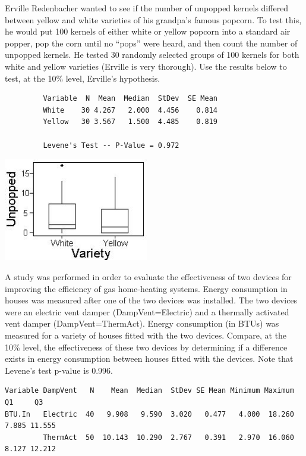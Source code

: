 \documentclass[10pt,openany]{book}\usepackage[]{graphicx}\usepackage[]{color}
\begin{document}
\begin{exsection}
  \item \label{revex:tTestPopcorn} Erville Redenbacher wanted to see if the number of unpopped kernels differed between yellow and white varieties of his grandpa's famous popcorn.  To test this, he would put 100 kernels of either white or yellow popcorn into a standard air popper, pop the corn until no ``pops'' were heard, and then count the number of unpopped kernels.  He tested 30 randomly selected groups of 100 kernels for both white and yellow varieties (Erville is very thorough).  Use the results below to test, at the 10\% level, Erville's hypothesis. 

  \begin{Verbatim}
         Variable  N  Mean  Median  StDev  SE Mean
         White    30 4.267   2.000  4.456    0.814
         Yellow   30 3.567   1.500  4.485    0.819

         Levene's Test -- P-Value = 0.972
  \end{Verbatim}
\begin{center}
    \includegraphics[width=2.5in]{Figs/t2_pcorn.jpg}
\end{center}

  \item \label{revex:tTestHeatVent} A study was performed in order to evaluate the effectiveness of two devices for improving the efficiency of gas home-heating systems.  Energy consumption in houses was measured after one of the two devices was installed.  The two devices were an electric vent damper (DampVent=Electric) and a thermally activated vent damper (DampVent=ThermAct).  Energy consumption (in BTUs) was measured for a variety of houses fitted with the two devices.  Compare, at the 10\% level, the effectiveness of these two devices by determining if a difference exists in energy consumption between houses fitted with the devices.  Note that Levene's test p-value is 0.996. 
  \begin{Verbatim}
Variable DampVent   N    Mean  Median  StDev SE Mean Minimum Maximum     Q1     Q3
BTU.In   Electric  40   9.908   9.590  3.020   0.477   4.000  18.260  7.885 11.555
         ThermAct  50  10.143  10.290  2.767   0.391   2.970  16.060  8.127 12.212
  \end{Verbatim}


\end{exsection}
\end{document}
